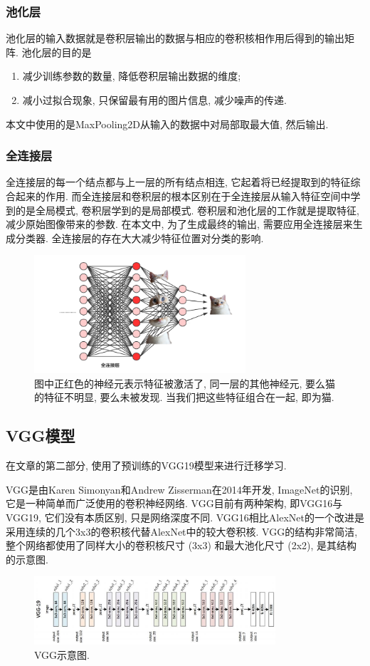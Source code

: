 \documentclass[lang=cn,11pt]{elegantpaper}
\begin{document}
\subsubsection*{池化层}
池化层的输入数据就是卷积层输出的数据与相应的卷积核相作用后得到的输出矩阵. 池化层的目的是
\begin{enumerate}
	\item 减少训练参数的数量, 降低卷积层输出数据的维度; 
	\item 减小过拟合现象, 只保留最有用的图片信息, 减少噪声的传递.
\end{enumerate}
本文中使用的是MaxPooling2D从输入的数据中对局部取最大值, 然后输出. 
\subsubsection*{全连接层}
全连接层的每一个结点都与上一层的所有结点相连, 它起着将已经提取到的特征综合起来的作用. 而全连接层和卷积层的根本区别在于全连接层从输入特征空间中学到的是全局模式, 卷积层学到的是局部模式. 卷积层和池化层的工作就是提取特征, 减少原始图像带来的参数. 在本文中, 为了生成最终的输出, 需要应用全连接层来生成分类器. 全连接层的存在大大减少特征位置对分类的影响. 
\begin{figure}[htbp]
\centering
  \includegraphics[width=0.7\textwidth]{densecat.png}
  \tiny
  \caption{图中正红色的神经元表示特征被激活了, 同一层的其他神经元, 要么猫的特征不明显, 要么未被发现. 当我们把这些特征组合在一起, 即为猫. \label{fig:densecat1}}
\end{figure}
\normalsize
\subsection{VGG模型}
在文章的第二部分, 使用了预训练的VGG19模型来进行迁移学习. 

VGG是由Karen Simonyan和Andrew Zisserman在2014年开发, ImageNet的识别, 它是一种简单而广泛使用的卷积神经网络. VGG目前有两种架构, 即VGG16与VGG19, 它们没有本质区别, 只是网络深度不同. VGG16相比AlexNet的一个改进是采用连续的几个3x3的卷积核代替AlexNet中的较大卷积核. VGG的结构非常简洁, 整个网络都使用了同样大小的卷积核尺寸 (3x3) 和最大池化尺寸 (2x2),  是其结构的示意图. 
\begin{figure}[htbp]
	\centering
	  \includegraphics[width=0.80\textwidth]{VGG}
	  \tiny
	  \caption{VGG示意图.\label{fig:vgg}}
\end{figure}
\end{document}

